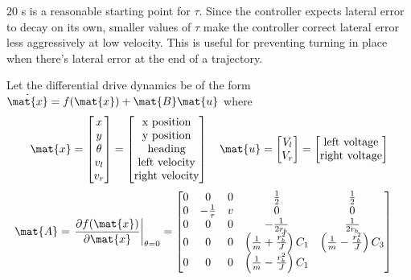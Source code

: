 $20$ s is a reasonable starting point for $\tau$. Since the controller expects
lateral error to decay on its own, smaller values of $\tau$ make the controller
correct lateral error less aggressively at low velocity. This is useful for
preventing turning in place when there's lateral error at the end of a
trajectory.
\begin{theorem}
  \label{thm:linear_time-varying_diff_drive_controller}

  Let the differential drive dynamics be of the form
  $\dot{\mat{x}} = f(\mat{x}) + \mat{B}\mat{u}$ where
  \begin{equation*}
    \mat{x} =
    \begin{bmatrix}
      x \\
      y \\
      \theta \\
      v_l \\
      v_r
    \end{bmatrix} =
    \begin{bmatrix}
      \text{x position} \\
      \text{y position} \\
      \text{heading} \\
      \text{left velocity} \\
      \text{right velocity}
    \end{bmatrix}
    \quad
    \mat{u} =
    \begin{bmatrix}
      V_l \\
      V_r
    \end{bmatrix} =
    \begin{bmatrix}
      \text{left voltage} \\
      \text{right voltage}
    \end{bmatrix}
  \end{equation*}
  \begin{align}
    \mat{A} &=
    \left.\frac{\partial f(\mat{x})}{\partial\mat{x}}\right|_{\theta = 0} =
    \begin{bmatrix}
      0 & 0 & 0 & \frac{1}{2} & \frac{1}{2} \\
      0 & -\frac{1}{\tau} & v & 0 & 0 \\
      0 & 0 & 0 & -\frac{1}{2r_b} & \frac{1}{2r_b} \\
      0 & 0 & 0 & \left(\frac{1}{m} + \frac{r_b^2}{J}\right) C_1 &
        \left(\frac{1}{m} - \frac{r_b^2}{J}\right) C_3 \\
      0 & 0 & 0 & \left(\frac{1}{m} - \frac{r_b^2}{J}\right) C_1 &

\end{bmatrix}
\end{align}
\end{theorem}
